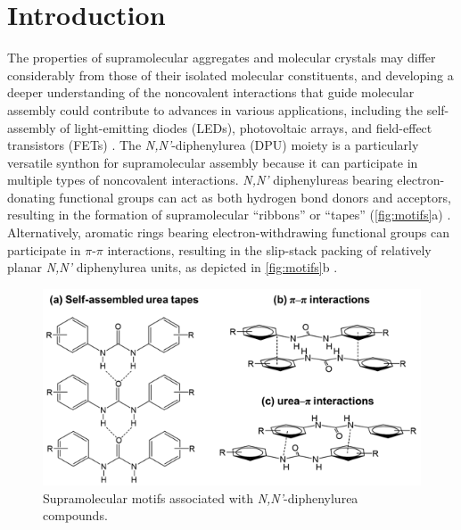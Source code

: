 \section{Introduction}
The properties of supramolecular aggregates and molecular crystals may differ considerably from those of their isolated molecular constituents, and developing a deeper understanding of the noncovalent interactions that guide molecular assembly could contribute to advances in various applications, including the self-assembly of light-emitting diodes (LEDs), photovoltaic arrays, and field-effect transistors (FETs) \citep{Desiraju2007a, Corpinot2019a, Albrecht2007, Mukherjee2015a, Schneider2009, Yao2018}. The \textit{N,N'}-diphenylurea (DPU) moiety is a particularly versatile synthon for supramolecular assembly because it can participate in multiple types of noncovalent interactions. \textit{N,N'} diphenylureas bearing electron-donating functional groups can act as both hydrogen bond donors and acceptors, resulting in the formation of supramolecular ``ribbons'' or ``tapes'' (\autoref{fig:motifs}a) \citep{Custelcean2008, Etter1988a}. Alternatively, aromatic rings bearing electron-withdrawing functional groups can participate in $\pi$-$\pi$ interactions, resulting in the slip-stack packing of relatively planar \textit{N,N'} diphenylurea units, as depicted in \autoref{fig:motifs}b \cite{Yao2018}.  


\begin{figure}[h!]
    \centering
    \includegraphics[width=0.8\linewidth]{figures/pub3/Picture1.png}
    \caption{Supramolecular motifs associated with \textit{N,N'}-diphenylurea compounds.}\label{fig:motifs}
\end{figure}

